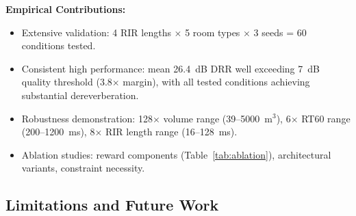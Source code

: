 \documentclass[12pt,a4paper]{article}
\begin{document}
\textbf{Empirical Contributions:}
\begin{itemize}
\item Extensive validation: 4 RIR lengths $\times$ 5 room types $\times$ 3 seeds = 60 conditions tested.
\item Consistent high performance: mean 26.4~dB DRR well exceeding 7~dB quality threshold (3.8$\times$ margin), with all tested conditions achieving substantial dereverberation.
\item Robustness demonstration: 128$\times$ volume range (39--5000~m$^3$), 6$\times$ RT60 range (200--1200~ms), 8$\times$ RIR length range (16--128~ms).
\item Ablation studies: reward components (Table~\ref{tab:ablation}), architectural variants, constraint necessity.
\end{itemize}

\subsection{Limitations and Future Work}
\end{document}

